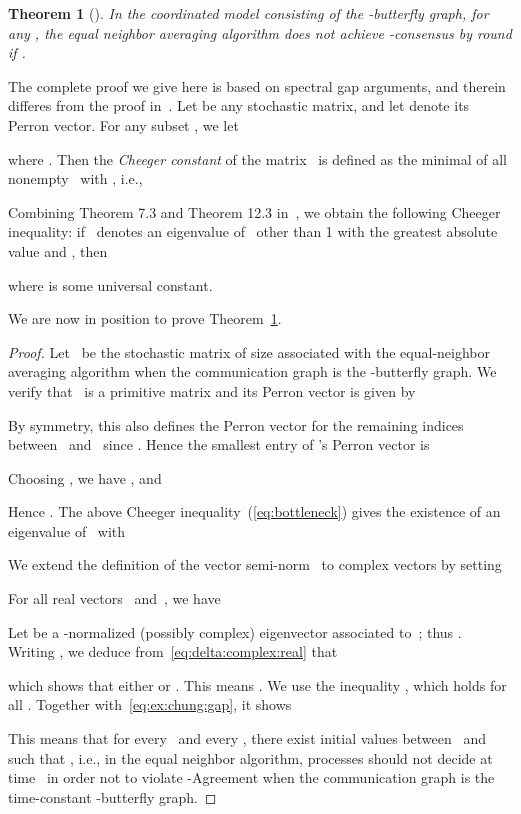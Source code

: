 \documentclass[a4paper]{article}
\theoremstyle{newthm}
\newtheorem{thm}{Theorem}
\begin{document}
\begin{thm}[\cite{OT11v1}]\label{thm:butterfly}
In the coordinated model consisting of  the -butterfly graph, for any ,
	the equal neighbor averaging algorithm does not achieve -consensus
	by round  if .
\end{thm}

The complete proof we give here is based on spectral gap arguments, and therein differes from the
        proof in~\cite{OT11v1}.
Let  be any stochastic matrix, and let  denote its Perron vector.
For any subset , we let 
	
	where .
Then the {\em Cheeger constant\/} of the matrix~ is defined as the minimal
	 of all nonempty~ with , i.e.,
	
Combining Theorem 7.3 and Theorem 12.3 in~\cite{LPW09}, we obtain 
	the following Cheeger inequality: if~ denotes an
	eigenvalue of~  other than 1 with the  greatest absolute value and , then 
	
	where  is some universal constant.
	
\vspace{0.2cm}
We are now in position to prove Theorem~\ref{thm:butterfly}.

\begin{proof}
Let~ be the stochastic matrix of size  associated with the equal-neighbor averaging 
	algorithm when the communication graph is the -butterfly graph.
We verify that~ is a primitive matrix and its Perron vector is given by

By symmetry, this also defines the Perron vector for the
remaining indices between~ and~ since . 
Hence the smallest entry of 's Perron vector is 
	
Choosing , we have  , and
	
Hence 
	.
The above Cheeger inequality~(\ref{eq:bottleneck}) gives the existence of an eigenvalue
	 of~ with 


We extend the definition of the vector semi-norm~ to complex
	vectors by setting
	 
For all real vectors~ and~, we have

Let  be a -normalized (possibly complex)
	eigenvector associated to~; thus
	.
Writing , we deduce from~\eqref{eq:delta:complex:real} that
	
	which shows that either 
	or .
This means .
We use the inequality , which holds for all .
Together with~\eqref{eq:ex:chung:gap}, it shows
	
This means that for every~ and every , 
	there exist initial values between~ and~ such that , i.e., 
	in the equal neighbor algorithm, processes should not decide at time~ in order not to violate 
	-Agreement when the communication graph is the time-constant -butterfly graph.
\end{proof}
\end{document}
